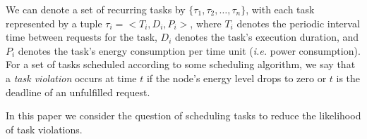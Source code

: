 We can denote a set of recurring tasks by $\{\tau_1, \tau_2, \ldots, \tau_n\}$, with each task represented by a tuple $\tau_i = <T_i, D_i, P_i>$, where $T_i$ denotes the periodic interval time between requests for the task, $D_i$ denotes the task's execution duration, and $P_i$ denotes the task's energy consumption per time unit (\emph{i.e.} power consumption). For a set of tasks scheduled according to some scheduling algorithm, we say that a \textit{task violation} occurs at time $t$ if the node's energy level drops to zero or $t$ is the deadline of an unfulfilled request.  



In this paper we consider the question of scheduling tasks to reduce the likelihood of task violations.
